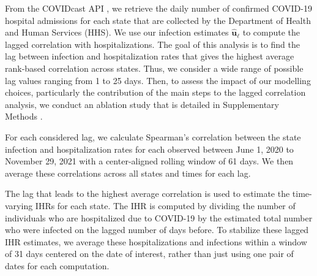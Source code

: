 From the COVIDcast API \citep{reinhart2021open}, we retrieve the daily number of
confirmed COVID-19 hospital admissions for each state that are collected by the
\US Department of Health and Human Services (HHS). We use our infection
estimates $\mathbf{\widehat{u}}_\ell$ to compute the lagged correlation with 
hospitalizations. The goal of this analysis is to find the lag between
infection and hospitalization rates that gives the highest average rank-based
correlation across \US states. Thus, we consider a wide range of possible
lag values ranging from 1 to 25 days. 
Then, to assess the impact of our modelling choices,
particularly the contribution of the main steps to the lagged
correlation analysis, we conduct an ablation study that is detailed
in Supplementary Methods .


For each considered lag, we calculate Spearman's correlation between the state
infection and hospitalization rates for each observed between June 1, 2020 to
November 29, 2021 with a center-aligned rolling window of 61 days. We then
average these correlations across all states and times for each lag. 

The lag that leads to the highest average correlation is used to estimate the
time-varying IHRs for each state. The IHR is computed by dividing the number of
individuals who are hospitalized due to COVID-19 by the estimated total number
who were infected on the lagged number of days before. To stabilize these lagged
IHR estimates, we average these hospitalizations and infections within a window
of 31 days centered on the date of interest, rather than just using one pair of
dates for each computation. 
